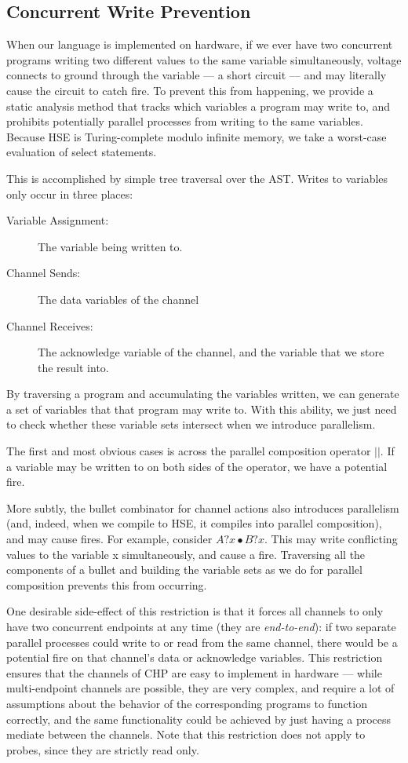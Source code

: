 \documentclass[times, 10pt]{article}
\begin{document}
\subsection{Concurrent Write Prevention}

When our language is implemented on hardware, if we ever have two concurrent
programs writing two different values to the same variable simultaneously,
voltage connects to ground through the variable --- a short circuit --- and may
literally cause the circuit to catch fire.  To prevent this from happening, we
provide a static analysis method that tracks which variables a program may write
to, and prohibits potentially parallel processes from writing to the same
variables.  Because HSE is Turing-complete modulo infinite memory, we take a
worst-case evaluation of select statements.

This is accomplished by simple tree traversal over the AST.  Writes to variables
only occur in three places:

\begin{description}
\item[Variable Assignment:] The variable being written to.
\item[Channel Sends:] The data variables of the channel
\item[Channel Receives:] The acknowledge variable of the channel, and the
variable that we store the result into.
\end{description}

By traversing a program and accumulating the variables written, we can generate
a set of variables that that program may write to.  With this ability, we just
need to check whether these variable sets intersect when we introduce
parallelism.

The first and most obvious cases is across the parallel composition operator
$||$.  If a variable may be written to on both sides of the operator, we have a
potential fire.

More subtly, the bullet combinator for channel actions also introduces
parallelism (and, indeed, when we compile to HSE, it compiles into parallel
composition), and may cause fires.  For example, consider $A?x \bullet B?x$.
This may write conflicting values to the variable x simultaneously, and cause a
fire.  Traversing all the components of a bullet and building the variable sets
as we do for parallel composition prevents this from occurring.

One desirable side-effect of this restriction is that it forces all channels to
only have two concurrent endpoints at any time (they are \emph{end-to-end}):  if
two separate parallel processes could write to or read from the same channel,
there would be a potential fire on that channel's data or acknowledge variables.
This restriction ensures that the channels of CHP are easy to implement in
hardware --- while multi-endpoint channels are possible, they are very complex,
and require a lot of assumptions about the behavior of the corresponding
programs to function correctly, and the same functionality could be achieved by
just having a process mediate between the channels.  Note that this restriction
does not apply to probes, since they are strictly read only.
\end{document}
